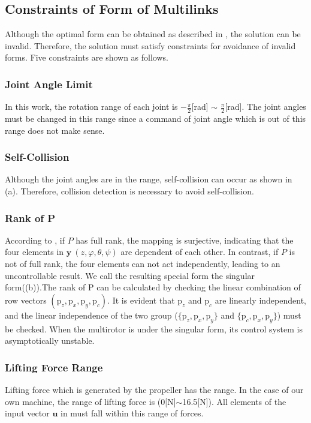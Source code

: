 \subsection{Constraints of Form of Multilinks}
 Although the optimal form can be obtained as described in , the solution can be invalid. Therefore, the solution must satisfy constraints for avoidance of invalid forms. Five constraints are shown as follows.
\subsubsection{Joint Angle Limit}
In this work, the rotation range of each joint is $-\frac{\pi}{2}$[rad] $\sim$ $\frac{\pi}{2}$[rad]. The joint angles must be changed in this range since a command of joint angle which is out of this range does not make sense.
\subsubsection{Self-Collision}
Although the joint angles are in the range, self-collision can occur as shown in (a). Therefore, collision detection is necessary to avoid self-collision.
\subsubsection{Rank of P}
According to , if $P$ has full rank, the mapping is surjective, indicating that the four elements in $\bm{y} \ (z,\varphi, \theta, \psi)$ are dependent of each other. In contrast, if $P$ is not of full rank, the four elements can not act independently, leading to an uncontrollable result. We call the resulting special form the singular form((b)).The rank of P can be calculated by checking the linear combination of row vectors $(\bm{\mathrm{p}}_z , \bm{\mathrm{p}}_x , \bm{\mathrm{p}}_y , \bm{\mathrm{p}}_c )$. It is evident that $\bm{\mathrm{p}}_z$ and $\bm{\mathrm{p}}_c$ are linearly independent, and the linear independence of the two group ($\{\bm{\mathrm{p}}_z, \bm{\mathrm{p}}_x , \bm{\mathrm{p}}_y \}$ and $\{\bm{\mathrm{p}}_c , \bm{\mathrm{p}}_x , \bm{\mathrm{p}}_y \}$) must be checked. When the multirotor is under the singular form, its control system is asymptotically unstable.
\subsubsection{Lifting Force Range}
Lifting force which is generated by the propeller has the range. In the case of our own machine, the range of lifting force is (0[N]$\sim$16.5[N]). All elements of the input vector $\bm{u}$ in  must fall within this range of forces.

